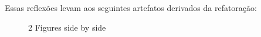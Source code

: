   Essas reflexões levam aos seguintes artefatos derivados da refatoração:

	\begin{figure}[h]
    \centering
    \qquad
    \caption{2 Figures side by side}%
    \label{fig:example}%
	\end{figure}
